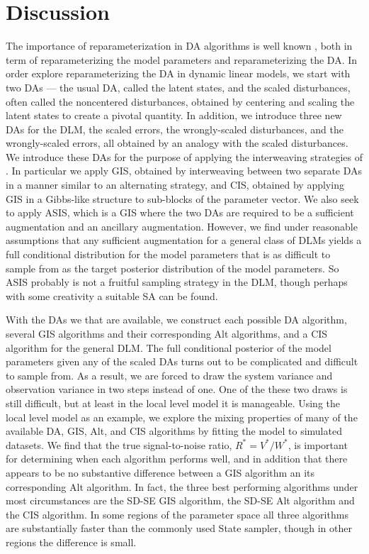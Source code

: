 \documentclass[12pt]{article}
\begin{document}
\section{Discussion}\label{sec:Discuss}

The importance of reparameterization in DA algorithms is well known \cite{papaspiliopoulos2007general}, both in term of reparameterizing the model parameters and reparameterizing the DA. In order explore reparameterizing the DA in dynamic linear models, we start with two DAs --- the usual DA, called the latent states, and the scaled disturbances, often called the noncentered disturbances, obtained by centering and scaling the latent states to create a pivotal quantity. In addition, we introduce three new DAs for the DLM, the scaled errors, the wrongly-scaled disturbances, and the wrongly-scaled errors, all obtained by an analogy with the scaled disturbances. We introduce these DAs for the purpose of applying the interweaving strategies of \citet{yu2011center}. In particular we apply GIS, obtained by interweaving between two separate DAs in a manner similar to an alternating strategy, and CIS, obtained by applying GIS in a Gibbs-like structure to sub-blocks of the parameter vector. We also seek to apply ASIS, which is a GIS where the two DAs are required to be a sufficient augmentation and an ancillary augmentation. However, we find under reasonable assumptions that any sufficient augmentation for a general class of DLMs yields a full conditional distribution for the model parameters that is as difficult to sample from as the target posterior distribution of the model parameters. So ASIS probably is not a fruitful sampling strategy in the DLM, though perhaps with some creativity a suitable SA can be found.

With the DAs we that are available, we construct each possible DA algorithm, several GIS algorithms and their corresponding Alt algorithms, and a CIS algorithm for the general DLM. The full conditional posterior of the model parameters given any of the scaled DAs turns out to be complicated and difficult to sample from. As a result, we are forced to draw the system variance and observation variance in two steps instead of one. One of the these two draws is still difficult, but at least in the local level model it is manageable. Using the local level model as an example, we explore the mixing properties of many of the available DA, GIS, Alt, and CIS algorithms by fitting the model to simulated datasets. We find that the true signal-to-noise ratio, $R^*=V^*/W^*$, is important for determining when each algorithm performs well, and in addition that there appears to be no substantive difference between a GIS algorithm an its corresponding Alt algorithm. In fact, the three best performing algorithms under most circumstances are the SD-SE GIS algorithm, the SD-SE Alt algorithm and the CIS algorithm. In some regions of the parameter space all three algorithms are substantially faster than the commonly used State sampler, though in other regions the difference is small.
\end{document}
